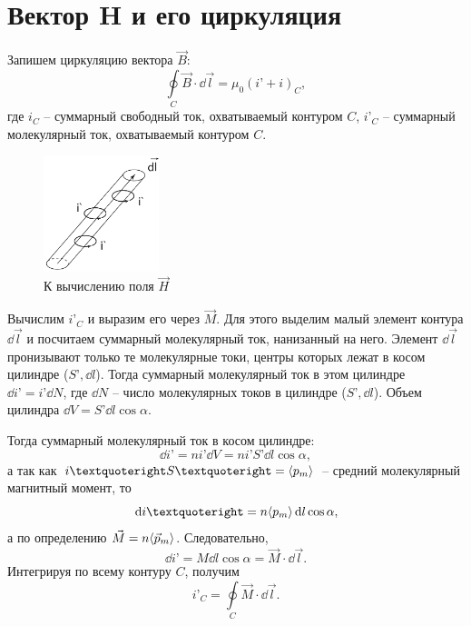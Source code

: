\section{Вектор \textbf{H} и его циркуляция}

    Запишем циркуляцию вектора \( \vec{B} \):
    \begin{equation}
        \oint\limits_C \vec{B}\cdot\dd\vec{l} = \mu_0(i’ + i)_C,
        \label{eq9:1}
    \end{equation}
    где \( i_C \) -- суммарный свободный ток, охватываемый контуром \( C \),
    \( i’_C \) -- суммарный молекулярный ток, охватываемый контуром \( C \).
        \begin{figure}[b!]
            \center
            \includegraphics[width=0.3\textwidth]{lec09/circulation_H.pdf}
            \caption{К вычислению поля \( \vec{H} \)}
        \end{figure}
    Вычислим \( i’_C \) и выразим его через \( \vec{M} \). Для этого выделим
    малый элемент контура \( \dd\vec{l} \) и посчитаем суммарный молекулярный
    ток, нанизанный на него. Элемент \( \dd\vec{l} \) пронизывают только те
    молекулярные токи, центры которых лежат в косом цилиндре (\(S’, \dd l\)).
    Тогда суммарный молекулярный ток в этом цилиндре \( \dd i’ = i’\dd N \),
    где \( \dd N \) -- число молекулярных токов в цилиндре (\(S’, \dd l\)).
    Объем цилиндра \( \dd V = S’\dd l\cos\alpha \).
    
    Тогда суммарный молекулярный ток в косом цилиндре:
    \[
        \dd i’ = ni’\dd V = ni’S’\dd l\cos\alpha,
    \]
    а так как \( i’S’ = \midnum{p_m} \) -- средний молекулярный магнитный
    момент, то
    \[
        \dd i’ = n\midnum{p_m}\dd l\cos\alpha,
    \]
    а по определению \( \vec{M} = n\langle\vec{p}_m\rangle \). Следовательно,
    \[
        \dd i’ = M\dd l\cos\alpha = \vec{M}\cdot\dd\vec{l}.
    \]
    Интегрируя по всему контуру \( C \), получим
    \begin{equation}
        i’_C = \oint\limits_C \vec{M}\cdot\dd\vec{l}.
        \label{eq9:2}
    \end{equation}
    
